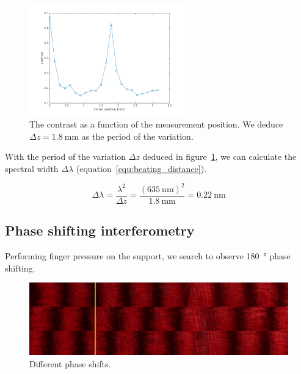 \documentclass[a4paper, 12pt]{paper}
\begin{document}
\begin{figure}[H]
    \includegraphics[width=0.6\textwidth]{img/contrast_graph}
    \caption{The contrast as a function of the measurement position. We deduce $\Delta z = \SI{1.8}{\milli\meter}$ as the period of the variation.}
\label{fig:contrast_graph}
\end{figure}

With the period of the variation $\Delta z$ deduced in figure~\ref{fig:contrast_graph}, we can calculate the spectral width $\Delta \lambda$ (equation~\ref{equ:beating_distance}).

\begin{equation}
    \Delta \lambda = \frac{\lambda^2}{\Delta z} = \frac{{\left( \SI{635}{\nano\meter} \right)}^2}{\SI{1.8}{\milli\meter}} = \SI{0.22}{\nano\meter}
    \label{equ:beating_distance}
\end{equation}

\subsection{Phase shifting interferometry}

Performing finger pressure on the support, we search to observe \SI{180}{\degree} phase shifting.

\begin{figure}[H]
    \centering
    \includegraphics[width=1.0\textwidth]{img/phase_fringes}
    \caption{Different phase shifts.}
\label{fig:phase_fringes}
\end{figure}
\end{document}
